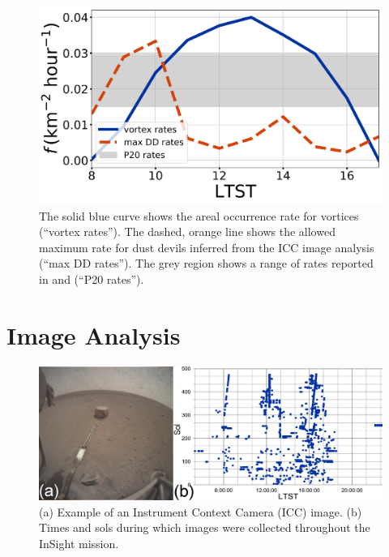 \documentclass{aastex63}
\begin{document}
\begin{figure}
    \centering
    \includegraphics[width=\textwidth]{figures/areal_occurrence_rate.png}
    \caption{The solid blue curve shows the areal occurrence rate for vortices (``vortex rates''). The dashed, orange line shows the allowed maximum rate for dust devils inferred from the ICC image analysis (``max DD rates''). The grey region shows a range of rates reported in \citet{2016Icar..266..315R} and \citet{2020GeoRL..4787234P} (``P20 rates'').}
    \label{fig:areal_occurrence_rate}
\end{figure}

\section{Image Analysis}
\label{sec:Image Analysis}

\begin{figure}
    \centering
    \includegraphics[width=\textwidth]{figures/Example-Image_Insight-Combined-Analysis.png}
    \caption{(a) Example of an Instrument Context Camera (ICC) image. (b) Times and sols during which images were collected throughout the InSight mission.}
    \label{fig:Example-Image_Insight-Combined-Analysis}
\end{figure}
\end{document}

